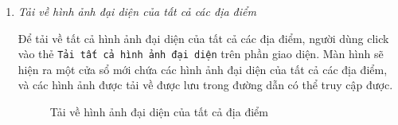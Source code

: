 \begin{enumerate}
\begin{enumerate}
\bf
\item \textit{Tải về hình ảnh đại diện của tất cả các địa điểm}
\rm

Để tải về tất cả hình ảnh đại diện của tất cả các địa điểm, người dùng click vào thẻ \texttt{Tải tất cả hình ảnh đại diện} trên phần giao diện. Màn hình sẽ hiện ra một cửa sổ mới chứa các hình ảnh đại diện của tất cả các địa điểm, và các hình ảnh được tải về được lưu trong đường dẫn có thể truy cập được.

\begin{figure}[H]
\end{figure}
\begin{figure}[H]
\caption{Tải về hình ảnh đại diện của tất cả địa điểm}
\end{figure}

\end{enumerate}
\end{enumerate}
\rm


